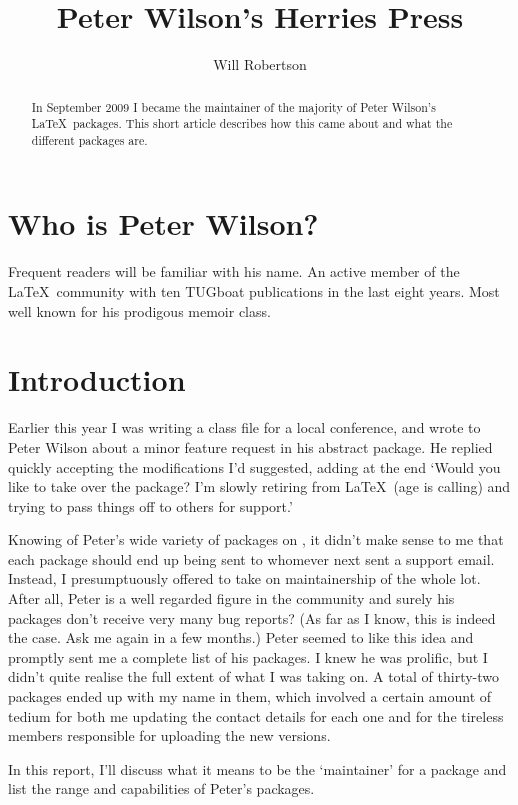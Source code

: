\documentclass{ltugboat}
\title{Peter Wilson's Herries Press}
\author{Will Robertson}
\begin{document}
\maketitle
\begin{abstract}
In September 2009 I became the maintainer of the majority of Peter Wilson's \LaTeX\ packages. This short article describes how this came about and what the different packages are.
\end{abstract}

\section{Who is Peter Wilson?}

Frequent readers will be familiar with his name. An active member of the \LaTeX\ community with ten TUGboat publications in the last eight years. Most well known for his prodigous \textsf{memoir} class.

\section{Introduction}

Earlier this year I was writing a class file for a local conference, and wrote to Peter Wilson about a minor feature request in his \textsf{abstract} package. He replied quickly accepting the modifications I'd suggested, adding at the end `{Would you like to take over the package? I'm slowly retiring from \LaTeX\ (age is calling) and trying to pass things off to others for support.}'

Knowing of Peter's wide variety of packages on , it didn't make sense to me that each package should end up being sent to whomever next sent a support email. Instead, I presumptuously offered to take on maintainership of the whole lot. After all, Peter is a well regarded figure in the community and surely his packages don't receive very many bug reports? (As far as I know, this is indeed the case. Ask me again in a few months.) Peter seemed to like this idea and promptly sent me a complete list of his packages. I knew he was prolific, but I didn't quite realise the full extent of what I was taking on. A total of thirty-two packages ended up with my name in them, which involved a certain amount of tedium for both me updating the contact details for each one and for the tireless  members responsible for uploading the new versions.

In this report, I'll discuss what it means to be the `maintainer' for a package and list the range and capabilities of Peter's packages.
\end{document}
